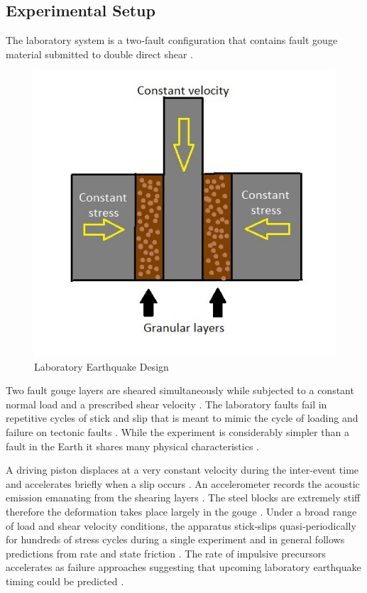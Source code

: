 \documentclass[]{llncs} %
\begin{document}
\subsection{Experimental Setup}
The laboratory system is a two‐fault configuration that contains fault gouge material submitted to double direct shear \cite{kaggle}. \par
\begin{figure}[h]
	\centering
	\includegraphics[width=.6\linewidth]{lab}
	\caption{Laboratory Earthquake Design}
	\label{fig:lab}
\end{figure}
Two fault gouge layers are sheared simultaneously while subjected to a constant normal load and a prescribed shear velocity \cite{kaggle}. The laboratory faults fail in repetitive cycles of stick and slip that is meant to mimic the cycle of loading and failure on tectonic faults \cite{kaggle}. While the experiment is considerably simpler than a fault in the Earth it shares many physical characteristics \cite{kaggle}. \par

A driving piston displaces at a very constant velocity during the inter-event time and accelerates briefly when a slip occurs \cite{Bertrand}. An accelerometer records the acoustic emission emanating from the shearing layers \cite{Bertrand}. The steel blocks are extremely stiff therefore the deformation takes place largely in the gouge \cite{Bertrand}. Under a broad range of load and shear velocity conditions, the apparatus stick‐slips quasi‐periodically for hundreds of stress cycles during a single experiment and in general follows predictions from rate and state friction \cite{Bertrand}. The rate of impulsive precursors accelerates as failure approaches suggesting that upcoming laboratory earthquake timing could be predicted \cite{Bertrand}. \par
\end{document}
